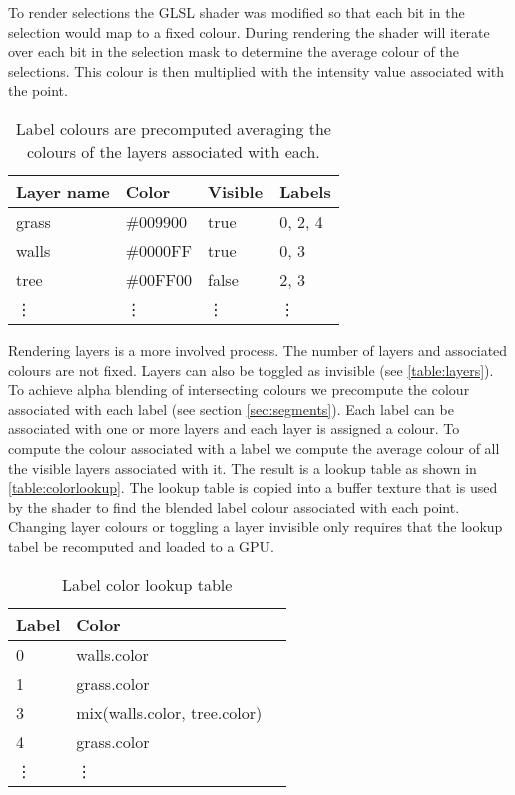 To render selections the GLSL shader was modified so that each bit in the selection would map to a fixed colour. During rendering the shader will iterate over each bit in the selection mask to determine the average colour of the selections. This colour is then multiplied with the intensity value associated with the point.

\begin{table}[ht]
	\begin{center}
	\begin{tabular}{|l|l|l|l|}
	\hline
	Layer  name & Color    & Visible & Labels \\
	\hline
	grass       & \#009900 & true & 0, 2, 4      \\
	walls       & \#0000FF & true & 0, 3  \\
	tree        & \#00FF00 & false & 2, 3   \\
	\vdots     & \vdots & \vdots   & \vdots          \\
	\hline
	\end{tabular}
	\end{center}
	\caption[Layer data structure]{Label colours are precomputed averaging the colours of the layers associated with each.}
	\label{table:layers}
\end{table}

Rendering layers is a more involved process. The number of layers and associated colours are not fixed. Layers can also be toggled as invisible (see \autoref{table:layers}). To achieve alpha blending of intersecting colours we precompute the colour associated with each label (see section \ref{sec:segments}). Each label can be associated with one or more layers and each layer is assigned a colour. To compute the colour associated with a label we compute the average colour of all the visible layers associated with it. The result is a lookup table as shown in \autoref{table:colorlookup}. The lookup table is copied into a buffer texture that is used by the shader to find the blended label colour associated with each point. Changing layer colours or toggling a layer invisible only requires that the lookup tabel be recomputed and loaded to a GPU.


\begin{table}[ht]
	\begin{center}
	\begin{tabular}{|l|l|l|}
	\hline
	Label & Color  \\
	\hline
	0       & walls.color \\
	1       & grass.color \\
	3       & mix(walls.color, tree.color)	\\
	4       & grass.color	\\
	\vdots     & \vdots      \\
	\hline
	\end{tabular}
	\end{center}
	\caption{Label color lookup table}
	\label{table:colorlookup}
\end{table}

